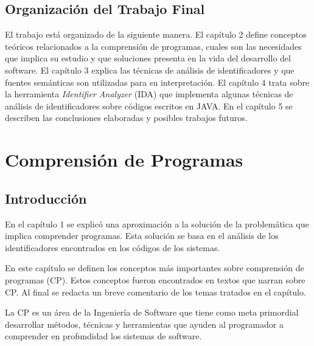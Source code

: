 \documentclass[a4paper,12pt]{report}
\begin{document}

\section{Organización del Trabajo Final}

El trabajo está organizado de la siguiente manera. El capítulo 2 define conceptos teóricos relacionados a la comprensión de programas, cuales son las necesidades que implica su estudio y que soluciones presenta en la vida del desarrollo del software. El capítulo 3 explica las técnicas de análisis de identificadores y que fuentes semánticas son utilizadas para su interpretación. El capítulo 4 trata sobre la herramienta \textit{Identifier Analyzer} (IDA) que implementa algunas técnicas de análisis de identificadores sobre códigos escritos en JAVA.
En el capítulo 5 se describen las conclusiones elaboradas y posibles trabajos futuros.



\chapter{Comprensión de Programas}
\section{Introducción}

En el capítulo 1 se explicó una aproximación a la solución de la problemática que implica comprender programas. Esta solución se basa en el análisis de los identificadores encontrados en los códigos de los sistemas.

En este capítulo se definen los conceptos más importantes sobre comprensión de programas (CP). Estos conceptos fueron encontrados en textos que narran sobre CP. Al final se redacta un breve comentario de los temas tratados en el capítulo.

La CP es un área de la Ingeniería de Software que tiene como meta primordial desarrollar métodos, técnicas y herramientas que ayuden al programador a comprender en profundidad los sistemas de software. 
\end{document}
